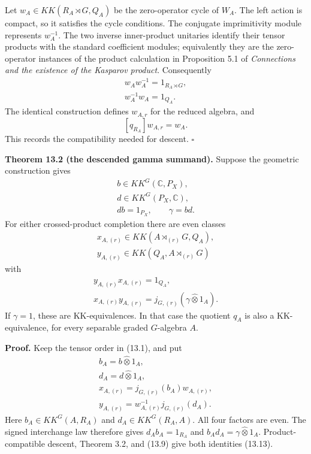 \documentclass[
  11pt,
]{article}
\begin{document}
Let \(w_A\in KK(R_A\rtimes G,Q_A)\) be the zero-operator cycle of
\(W_A\). The left action is compact, so it satisfies the cycle
conditions. The conjugate imprimitivity module represents \(w_A^{-1}\).
The two inverse inner-product unitaries identify their tensor products
with the standard coefficient modules; equivalently they are the
zero-operator instances of the product calculation in Proposition 5.1 of
\emph{Connections and the existence of the Kasparov product}.
Consequently \[
\begin{gathered}
w_Aw_A^{-1}=1_{R_A\rtimes G},\\
w_A^{-1}w_A=1_{Q_A}.
\end{gathered}
\tag{13.9}
\] The identical construction defines \(w_{A,r}\) for the reduced
algebra, and \[
[q_{R_A}]w_{A,r}=w_A.
\tag{13.10}
\] This records the compatibility needed for descent. \(\square\)

\textbf{Theorem 13.2 (the descended gamma summand).} Suppose the
geometric construction gives \[
\begin{gathered}
b\in KK^G(\mathbb C,P_X),\\
d\in KK^G(P_X,\mathbb C),\\
db=1_{P_X},\qquad \gamma=bd.
\end{gathered}
\tag{13.11}
\] For either crossed-product completion there are even classes \[
\begin{gathered}
x_{A,(r)}\in KK(A\rtimes_{(r)}G,Q_A),\\
y_{A,(r)}\in KK(Q_A,A\rtimes_{(r)}G)
\end{gathered}
\tag{13.12}
\] with \[
\begin{gathered}
y_{A,(r)}x_{A,(r)}=1_{Q_A},\\
x_{A,(r)}y_{A,(r)}
 =j_{G,(r)}(\gamma\widehat\otimes1_A).
\end{gathered}
\tag{13.13}
\] If \(\gamma=1\), these are KK-equivalences. In that case the quotient
\(q_A\) is also a KK-equivalence, for every separable graded
\(G\)-algebra \(A\).

\textbf{Proof.} Keep the tensor order in (13.1), and put \[
\begin{gathered}
b_A=b\widehat\otimes1_A,\\
d_A=d\widehat\otimes1_A,\\
x_{A,(r)}=j_{G,(r)}(b_A)w_{A,(r)},\\
y_{A,(r)}=w_{A,(r)}^{-1}j_{G,(r)}(d_A).
\end{gathered}
\tag{13.14}
\] Here \(b_A\in KK^G(A,R_A)\) and \(d_A\in KK^G(R_A,A)\). All four
factors are even. The signed interchange law therefore gives
\(d_Ab_A=1_{R_A}\) and \(b_Ad_A=\gamma\widehat\otimes1_A\).
Product-compatible descent, Theorem 3.2, and (13.9) give both identities
(13.13).
\end{document}
